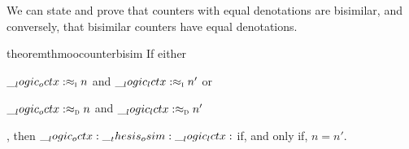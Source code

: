 
We can state and prove that counters with equal denotations are bisimilar, and conversely, that bisimilar counters have equal denotations.
\begin{restatable}[
  label=thm:oo-counter-bisim
]{theorem}{thmoocounterbisim}
  If either
  \begin{enumerate*}[label=\emph{(\roman*)}]
  \item $\__logic_octx: \approx\sb{\text{\normalfont\scshape i}} n$ and $\__logic_lctx: \approx\sb{\text{\normalfont\scshape i}} n'$ or
  \item $\__logic_octx: \approx\sb{\text{\normalfont\scshape d}} n$ and $\__logic_lctx: \approx\sb{\text{\normalfont\scshape d}} n'$
  \end{enumerate*}, then $\__logic_octx: \__thesis_osim: \__logic_lctx:$ if, and only if, $n = n'$.
\end{restatable}


